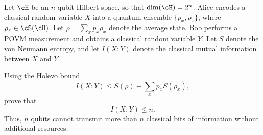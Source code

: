 Let $\cH$ be an $n$-qubit Hilbert space, so that $\dim(\cH)=2^n$. Alice encodes a classical random variable $X$ into a quantum ensemble $\{p_x,\rho_x\}$, where $\rho_x\in \cS(\cH)$. Let $\rho=\sum_x p_x\rho_x$ denote the average state.
Bob performs a POVM measurement and obtains a classical random variable $Y$.
Let $S$ denote the von Neumann entropy, and let $I(X:Y)$ denote the classical mutual information between $X$ and $Y$.

Using the Holevo bound
$$
I(X:Y)
\leq
S(\rho)-\sum_x p_x S(\rho_x),
$$
prove that
$$
I(X:Y)\leq n.
$$
Thus, $n$ qubits cannot transmit more than $n$ classical bits of information without additional resources.
